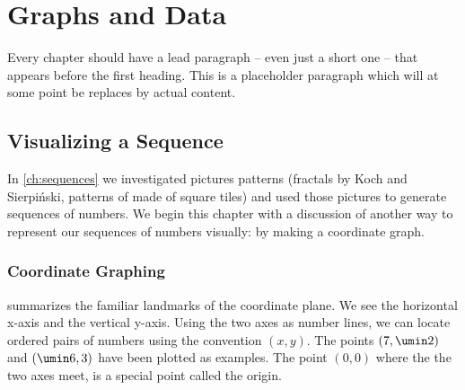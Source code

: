 \chapter{Graphs and Data}
\label{ch:graphs}


Every chapter should have a lead paragraph -- even just a short one -- that appears before the first heading. This is a placeholder paragraph which will at some point be replaces by actual content.


\section{Visualizing a Sequence}
\label{sec:vizsequence}

In \cref{ch:sequences} we investigated pictures patterns (fractals by Koch and Sierpi\'nski, patterns of made of square tiles) and used those pictures to generate sequences of numbers. We begin this chapter with a discussion of another way to represent our sequences of numbers visually: by making a coordinate graph.

\subsection{Coordinate Graphing}

 summarizes the familiar landmarks of the \gls{coordinate plane}. We see the horizontal \gls{x-axis} and the vertical \gls{y-axis}. Using the two axes as number lines, we can locate \glspl{ordered pair} of numbers using the convention $(x,y)$. The points $(7, \umin2)$ and $(\umin6, 3)$ have been plotted as examples. The point $(0,0)$ where the the two axes meet, is a special point called the \gls{origin}.


